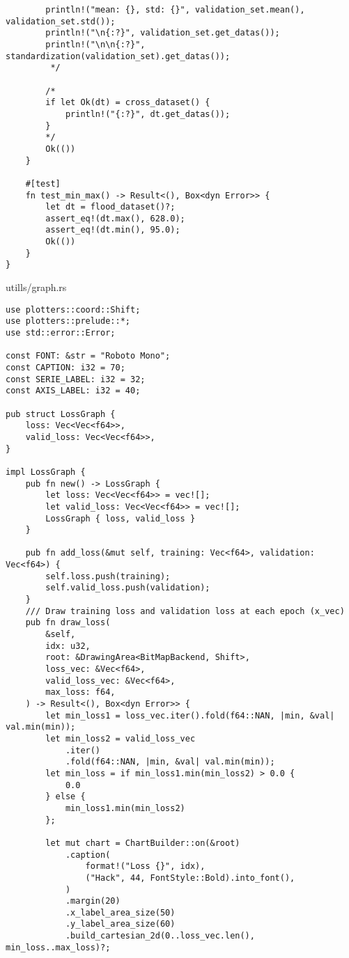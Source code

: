 \begin{code}
\begin{verbatim}
        println!("mean: {}, std: {}", validation_set.mean(), validation_set.std());
        println!("\n{:?}", validation_set.get_datas());
        println!("\n\n{:?}", standardization(validation_set).get_datas());
         */

        /*
        if let Ok(dt) = cross_dataset() {
            println!("{:?}", dt.get_datas());
        }
        */
        Ok(())
    }

    #[test]
    fn test_min_max() -> Result<(), Box<dyn Error>> {
        let dt = flood_dataset()?;
        assert_eq!(dt.max(), 628.0);
        assert_eq!(dt.min(), 95.0);
        Ok(())
    }
}

\end{verbatim}
\end{code}

\begin{code}
\caption{utills/graph.rs}
\begin{verbatim}  
use plotters::coord::Shift;
use plotters::prelude::*;
use std::error::Error;

const FONT: &str = "Roboto Mono";
const CAPTION: i32 = 70;
const SERIE_LABEL: i32 = 32;
const AXIS_LABEL: i32 = 40;

pub struct LossGraph {
    loss: Vec<Vec<f64>>,
    valid_loss: Vec<Vec<f64>>,
}

impl LossGraph {
    pub fn new() -> LossGraph {
        let loss: Vec<Vec<f64>> = vec![];
        let valid_loss: Vec<Vec<f64>> = vec![];
        LossGraph { loss, valid_loss }
    }

    pub fn add_loss(&mut self, training: Vec<f64>, validation: Vec<f64>) {
        self.loss.push(training);
        self.valid_loss.push(validation);
    }
    /// Draw training loss and validation loss at each epoch (x_vec)
    pub fn draw_loss(
        &self,
        idx: u32,
        root: &DrawingArea<BitMapBackend, Shift>,
        loss_vec: &Vec<f64>,
        valid_loss_vec: &Vec<f64>,
        max_loss: f64,
    ) -> Result<(), Box<dyn Error>> {
        let min_loss1 = loss_vec.iter().fold(f64::NAN, |min, &val| val.min(min));
        let min_loss2 = valid_loss_vec
            .iter()
            .fold(f64::NAN, |min, &val| val.min(min));
        let min_loss = if min_loss1.min(min_loss2) > 0.0 {
            0.0
        } else {
            min_loss1.min(min_loss2)
        };

        let mut chart = ChartBuilder::on(&root)
            .caption(
                format!("Loss {}", idx),
                ("Hack", 44, FontStyle::Bold).into_font(),
            )
            .margin(20)
            .x_label_area_size(50)
            .y_label_area_size(60)
            .build_cartesian_2d(0..loss_vec.len(), min_loss..max_loss)?;


\end{verbatim}
\end{code}

